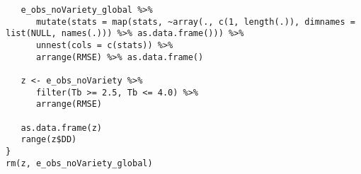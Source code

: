 \begin{verbatim}
   e_obs_noVariety_global %>%
      mutate(stats = map(stats, ~array(., c(1, length(.)), dimnames = list(NULL, names(.))) %>% as.data.frame())) %>%
      unnest(cols = c(stats)) %>%
      arrange(RMSE) %>% as.data.frame()

   z <- e_obs_noVariety %>%
      filter(Tb >= 2.5, Tb <= 4.0) %>%
      arrange(RMSE)

   as.data.frame(z)
   range(z$DD)
}
rm(z, e_obs_noVariety_global)
\end{verbatim}
\endpreview

